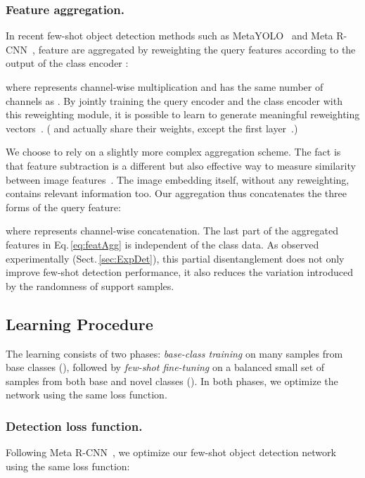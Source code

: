 \documentclass[runningheads]{llncs}
\begin{document}
\subsubsection{Feature aggregation.}
In recent few-shot object detection methods such as MetaYOLO~\cite{YOLO-FS2019} and Meta R-CNN~\cite{metarcnn2019}, feature are aggregated by reweighting the query features  according to the output  of the class encoder :

where  represents channel-wise multiplication and  has the same number of channels as . 
By jointly training the query encoder  and the class encoder  with this reweighting module, it is possible to learn to generate meaningful reweighting vectors~. ( and  actually share their weights, except the first layer~\cite{metarcnn2019}.) 

We choose to rely on a slightly more complex aggregation scheme. The fact is that feature subtraction is a different but also effective way to measure similarity between image features~\cite{ammiratoTDID18,Kuo2019ShapeMaskLT}. The image embedding  itself, without any reweighting, contains relevant information too. Our aggregation thus concatenates the three forms of the query feature: 

where  represents channel-wise concatenation. The last part of the aggregated features in Eq.\,\eqref{eq:featAgg} is independent of the class data. 
As observed experimentally (Sect.\,\ref{sec:ExpDet}), this partial disentanglement does not only improve few-shot detection performance, it also reduces the variation introduced by the randomness of support samples.



\subsection{Learning Procedure}
\label{sec:LearningProc}

The learning consists of two phases: \emph{base-class training} on many samples from base classes (), followed by \emph{few-shot fine-tuning} on a balanced small set of samples from both base and novel classes ().
In both phases, we optimize the network using the same loss function. 


\subsubsection{Detection loss function.}
Following Meta R-CNN~\cite{metarcnn2019}, we optimize our few-shot object detection network using the same loss function:
\end{document}
